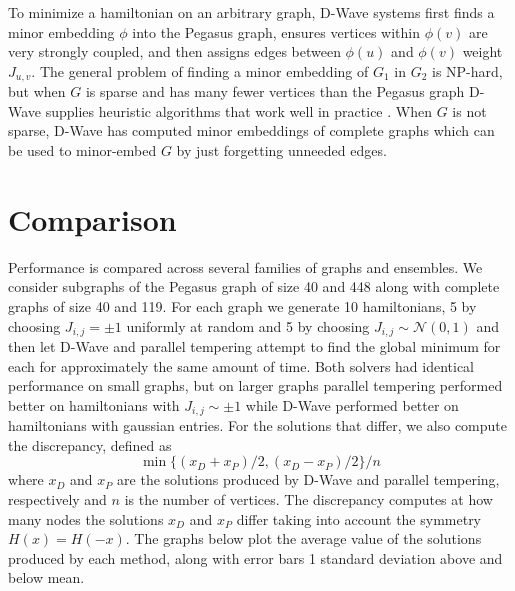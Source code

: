 \documentclass[12pt]{article}
\newcommand{\1}{\mathbf{1}}
\theoremstyle{remark}
\theoremstyle{definition}
\theoremstyle{proposition}
\theoremstyle{lemma}
\theoremstyle{definition}
\begin{document}
	To minimize a hamiltonian on an arbitrary graph, D-Wave systems first finds a minor embedding $\phi$ into the Pegasus graph, ensures vertices within $\phi(v)$ are very strongly coupled, and then assigns edges between $\phi(u)$ and $\phi(v)$ weight $J_{u, v}$. The general problem of finding a minor embedding of $G_1$ in $G_2$ is NP-hard, but when $G$ is sparse and has many fewer vertices than the Pegasus graph D-Wave supplies heuristic algorithms that work well in practice \cite{cai2014practical}. When $G$ is not sparse, D-Wave has computed minor embeddings of complete graphs which can be used to minor-embed $G$ by just forgetting unneeded edges.
	
	\section{Comparison}
	\indent \indent Performance is compared across several families of graphs and ensembles. We consider subgraphs of the Pegasus graph of size 40 and 448 along with complete graphs of size 40 and 119. For each graph we generate 10 hamiltonians, 5 by choosing $J_{i, j} = \pm 1$ uniformly at random and 5 by choosing $J_{i, j} \sim \mathcal{N}(0, 1)$ and then let D-Wave and parallel tempering attempt to find the global minimum for each for approximately the same amount of time. Both solvers had identical performance on small graphs, but on larger graphs parallel tempering performed better on hamiltonians with $J_{i, j} \sim \pm 1$ while D-Wave performed better on hamiltonians with gaussian entries. For the solutions that differ, we also compute the discrepancy, defined as
	$$\min \{(x_D + x_P)/2, (x_D - x_P)/2\} / n$$
	where $x_D$ and $x_P$  are the solutions produced by D-Wave and parallel tempering, respectively and $n$ is the number of vertices. The discrepancy computes at how many nodes the solutions $x_D$ and $x_P$ differ taking into account the symmetry $H(x) = H(-x)$. The graphs below plot the average value of the solutions produced by each method, along with error bars 1 standard deviation above and below mean.
	
\end{document}
